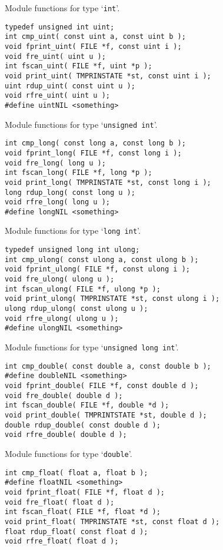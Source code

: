 \begin{desc}
Module functions for type `{\tt int}'.
\end{desc}
\begin{verbatim}
typedef unsigned int uint;
int cmp_uint( const uint a, const uint b );
void fprint_uint( FILE *f, const uint i );
void fre_uint( uint u );
int fscan_uint( FILE *f, uint *p );
void print_uint( TMPRINSTATE *st, const uint i );
uint rdup_uint( const uint u );
void rfre_uint( uint u );
#define uintNIL <something>
\end{verbatim}
\begin{desc}
Module functions for type `{\tt unsigned int}'.
\end{desc}
\begin{verbatim}
int cmp_long( const long a, const long b );
void fprint_long( FILE *f, const long i );
void fre_long( long u );
int fscan_long( FILE *f, long *p );
void print_long( TMPRINSTATE *st, const long i );
long rdup_long( const long u );
void rfre_long( long u );
#define longNIL <something>
\end{verbatim}
\begin{desc}
Module functions for type `{\tt long int}'.
\end{desc}
\begin{verbatim}
typedef unsigned long int ulong;
int cmp_ulong( const ulong a, const ulong b );
void fprint_ulong( FILE *f, const ulong i );
void fre_ulong( ulong u );
int fscan_ulong( FILE *f, ulong *p );
void print_ulong( TMPRINSTATE *st, const ulong i );
ulong rdup_ulong( const ulong u );
void rfre_ulong( ulong u );
#define ulongNIL <something>
\end{verbatim}
\begin{desc}
Module functions for type `{\tt unsigned long int}'.
\end{desc}
\begin{verbatim}
int cmp_double( const double a, const double b );
#define doubleNIL <something>
void fprint_double( FILE *f, const double d );
void fre_double( double d );
int fscan_double( FILE *f, double *d );
void print_double( TMPRINTSTATE *st, double d );
double rdup_double( const double d );
void rfre_double( double d );
\end{verbatim}
\begin{desc}
Module functions for type `{\tt double}'.
\end{desc}
\begin{verbatim}
int cmp_float( float a, float b );
#define floatNIL <something>
void fprint_float( FILE *f, float d );
void fre_float( float d );
int fscan_float( FILE *f, float *d );
void print_float( TMPRINSTATE *st, const float d );
float rdup_float( const float d );
void rfre_float( float d );
\end{verbatim}

